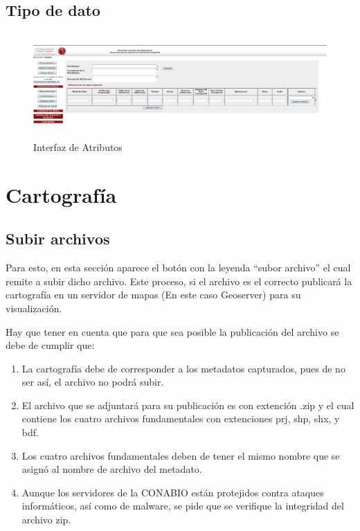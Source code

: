 \documentclass[twoside]{book}
\begin{document}
\subsection{Tipo de dato}

\begin{figure}[h!] %
	\includegraphics[width=12cm, height=4cm]{img/ambienteDeTrabajo} %
	\caption{Interfaz de Atributos}
\end{figure}


\section{Cartografía}
\subsection{Subir archivos}


Para esto, en esta sección aparece el botón con la leyenda “subor archivo” el cual remite a subir dicho archivo.  Este proceso, si el archivo es el correcto publicará la cartografía en un servidor de mapas (En este caso Geoserver) para su visualización.

Hay que tener en cuenta que para que sea posible la publicación del archivo se debe de cumplir que:
\begin{enumerate}
\item La cartografía debe de corresponder a los metadatos capturados, pues de no ser así, el archivo no podrá subir.

\item El archivo que se adjuntará para su publicación es con extención .zip y el cual contiene los cuatro archivos fundamentales con extenciones prj, shp, shx, y bdf.

\item Los cuatro archivos fundamentales deben de tener el mismo nombre que se asignó al nombre de archivo del metadato.

\item Aunque los servidores de la CONABIO están protejidos contra ataques informáticos, así como de malware, se pide que se verifique la integridad del archivo zip.

\end{enumerate}
\end{document}

